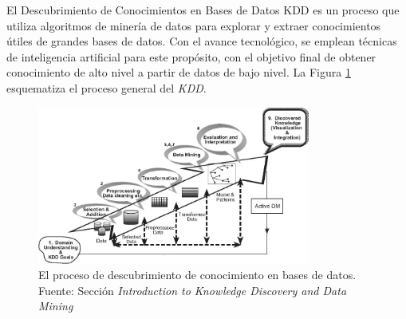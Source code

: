 El Descubrimiento de Conocimientos en Bases de Datos \gls{KDD} es un proceso que utiliza algoritmos de minería de datos para explorar y extraer conocimientos útiles de grandes bases de datos. Con el avance tecnológico, se emplean técnicas de inteligencia artificial para este propósito, con el objetivo final de obtener conocimiento de alto nivel a partir de datos de bajo nivel. La Figura \ref{fig:kdd} esquematiza el proceso general del \textit{KDD}.

\begin{figure}[H]
  \centering
  \includegraphics[angle=90,width=0.8\textwidth]{figures/chapter02/KDD.jpg}
  \caption{El proceso de descubrimiento de conocimiento en bases de datos.\\Fuente: Sección \textit{Introduction to Knowledge Discovery and Data Mining} \cite{rokach2010data}}
  \label{fig:kdd}
\end{figure}


